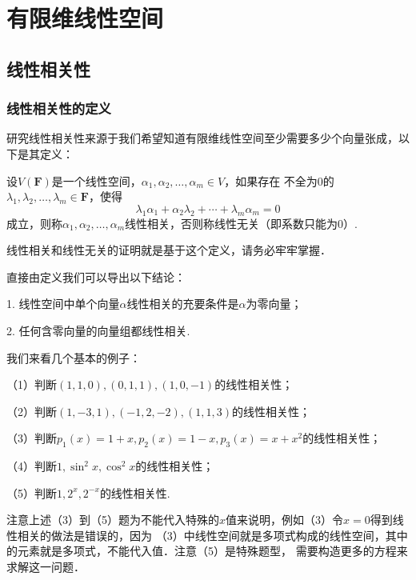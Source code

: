\chapter{有限维线性空间}

\section{线性相关性}
\subsection{线性相关性的定义}
研究线性相关性来源于我们希望知道有限维线性空间至少需要多少个向量张成，以下是其定义：
\begin{definition}
	设$V(\mathbf{F})$是一个线性空间，$\alpha_1,\alpha_2,\ldots,\alpha_m\in V$，如果存在
	不全为$0$的$\lambda_1,\lambda_2,\ldots,\lambda_m\in\mathbf{F}$，使得
	$$\lambda_1\alpha_1+\alpha_2\lambda_2+\cdots+\lambda_m\alpha_m=0$$
	成立，则称$\alpha_1,\alpha_2,\ldots,\alpha_m$线性相关，否则称线性无关（即系数只能为$0$）.
\end{definition}
线性相关和线性无关的证明就是基于这个定义，请务必牢牢掌握．

直接由定义我们可以导出以下结论：

1. 线性空间中单个向量$\alpha$线性相关的充要条件是$\alpha$为零向量；

2. 任何含零向量的向量组都线性相关.

我们来看几个基本的例子：
\begin{example}
	\textup{（1）}判断$(1,1,0),(0,1,1),(1,0,-1)$的线性相关性；

	\textup{（2）}判断$(1,-3,1),(-1,2,-2),(1,1,3)$的线性相关性；

	\textup{（3）}判断$p_1(x)=1+x,p_2(x)=1-x,p_3(x)=x+x^2$的线性相关性；

	\textup{（4）}判断$1,\sin^2x,\cos^2x$的线性相关性；

	\textup{（5）}判断$1,2^x,2^{-x}$的线性相关性.
\end{example}
注意上述（3）到（5）题为不能代入特殊的$x$值来说明，例如（3）令$x=0$得到线性相关的做法是错误的，因为
（3）中线性空间就是多项式构成的线性空间，其中的元素就是多项式，不能代入值．注意（5）是特殊题型，
需要构造更多的方程来求解这一问题．
